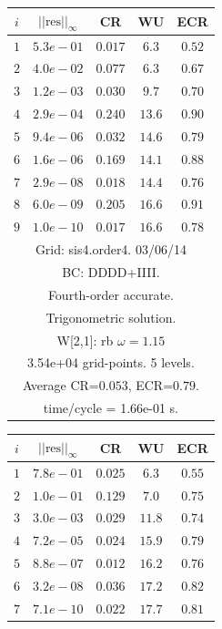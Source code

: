 \begin{table}[hbt]
\begin{center}
{\begin{tabular}{|c|c|c|c|c|}
 $i$   & $\vert\vert\mbox{res}\vert\vert_\infty$  &  CR     &  WU    & ECR  \\   \hline 
 $ 1$  & $ 5.3e-01$ & $0.017$ & $ 6.3$ & $0.52$ \\ 
 $ 2$  & $ 4.0e-02$ & $0.077$ & $ 6.3$ & $0.67$ \\ 
 $ 3$  & $ 1.2e-03$ & $0.030$ & $ 9.7$ & $0.70$ \\ 
 $ 4$  & $ 2.9e-04$ & $0.240$ & $13.6$ & $0.90$ \\ 
 $ 5$  & $ 9.4e-06$ & $0.032$ & $14.6$ & $0.79$ \\ 
 $ 6$  & $ 1.6e-06$ & $0.169$ & $14.1$ & $0.88$ \\ 
 $ 7$  & $ 2.9e-08$ & $0.018$ & $14.4$ & $0.76$ \\ 
 $ 8$  & $ 6.0e-09$ & $0.205$ & $16.6$ & $0.91$ \\ 
 $ 9$  & $ 1.0e-10$ & $0.017$ & $16.6$ & $0.78$ \\ 
\hline 
\multicolumn{5}{|c|}{Grid: sis4.order4. 03/06/14}  \\
\multicolumn{5}{|c|}{BC: DDDD+IIII.}  \\
\multicolumn{5}{|c|}{Fourth-order accurate.}  \\
\multicolumn{5}{|c|}{Trigonometric solution.}  \\
\multicolumn{5}{|c|}{W[2,1]: rb $\omega=1.15$}  \\
\multicolumn{5}{|c|}{3.54e+04 grid-points. 5 levels.}  \\
\multicolumn{5}{|c|}{Average CR=$0.053$, ECR=$0.79$.}  \\
\multicolumn{5}{|c|}{time/cycle = 1.66e-01 s.}  \\
\hline 
\end{tabular}
\begin{tabular}{|c|c|c|c|c|} \hline 
 $i$   & $\vert\vert\mbox{res}\vert\vert_\infty$  &  CR     &  WU    & ECR  \\   \hline 
 $ 1$  & $ 7.8e-01$ & $0.025$ & $ 6.3$ & $0.55$ \\ 
 $ 2$  & $ 1.0e-01$ & $0.129$ & $ 7.0$ & $0.75$ \\ 
 $ 3$  & $ 3.0e-03$ & $0.029$ & $11.8$ & $0.74$ \\ 
 $ 4$  & $ 7.2e-05$ & $0.024$ & $15.9$ & $0.79$ \\ 
 $ 5$  & $ 8.8e-07$ & $0.012$ & $16.2$ & $0.76$ \\ 
 $ 6$  & $ 3.2e-08$ & $0.036$ & $17.2$ & $0.82$ \\ 
 $ 7$  & $ 7.1e-10$ & $0.022$ & $17.7$ & $0.81$ \\ 

\end{tabular}}
\end{center}
\end{table}
